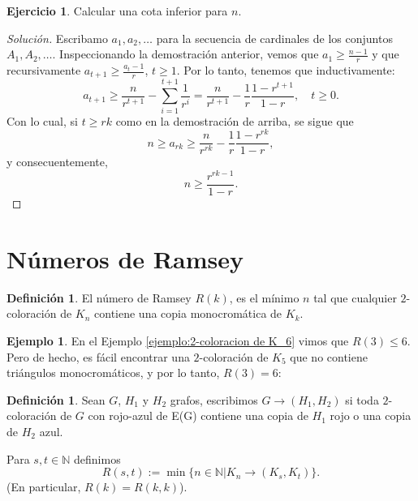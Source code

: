 \documentclass[12pt]{report}
\theoremstyle{plain}
\theoremstyle{definition}
\newtheorem{definition}[theorem]{Definición}
\newtheorem{example}[theorem]{Ejemplo}
\newtheorem{exercise}[theorem]{Ejercicio}
\newenvironment{solution}{\begin{proof}[Solución]}{\end{proof}}
\newcommand{\naturals}{\mathbb{N}}
\begin{document}
\begin{exercise}
Calcular una cota inferior para $n$.
\end{exercise}
\begin{solution}
Escribamo $a_1, a_2, \ldots$ para la secuencia de cardinales de los conjuntos $A_1, A_2, \ldots$. Inspeccionando la demostración anterior, vemos que $a_1 \geq \frac{n-1}{r}$ y que recursivamente $a_{t+1} \geq \frac{a_t - 1}{r}$, $t \geq 1$. Por lo tanto, tenemos que inductivamente:
\[
    a_{t+1} \geq \frac{n}{r^{t+1}} - \sum_{i = 1}^{t+1} \frac{1}{r^i} = \frac{n}{r^{t+1}}  - \frac{1}{r} \frac{1 - r^{t+1}}{1 - r}, \quad t \geq 0.
\]
Con lo cual, si $t \geq r k$ como en la demostración de arriba, se sigue que
\[
    n \geq a_{rk} \geq  \frac{n}{r^{rk}} - \frac{1}{r} \frac{1 - r^{rk}}{1 -r},
\]
y consecuentemente,
\[
    \boxed{n \geq \frac{r^{rk-1}}{1 - r}.}
\]
\end{solution}

\section{Números de Ramsey}

\begin{definition}
El número de Ramsey $R(k)$, es el mínimo $n$ tal que cualquier $2$-coloración de $K_n$ contiene una copia monocromática de $K_k$.
\end{definition}


\begin{example}
En el Ejemplo \ref{ejemplo:2-coloracion de K_6} vimos que $R(3) \leq 6$. Pero de hecho, es fácil encontrar una $2$-coloración de $K_5$ que no contiene triángulos monocromáticos, y por lo tanto, $R(3) = 6$:

\end{example}


\begin{definition}
Sean $G$, $H_1$ y $H_2$ grafos, escribimos $G \to (H_1, H_2)$ si toda $2$-coloración de $G$ con rojo-azul de E(G) contiene una copia de $H_1$ rojo o una copia de $H_2$ azul.

Para $s,t \in \naturals$ definimos
\[
    R(s,t) := \min \{n \in \naturals | K_n \to (K_s,K_t)\}.
\]
(En particular, $R(k) = R(k,k)$).
\end{definition}
\end{document}
